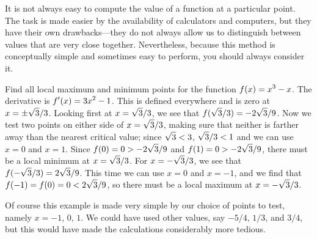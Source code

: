 
It is not always easy to compute the value of a function at a
particular point. The task is made easier by the availability of
calculators and computers, but they have their own drawbacks---they do
not always allow us to distinguish between values that are very close
together. Nevertheless, because this method is conceptually simple and
sometimes easy to perform, you should always consider it.

\begin{example}
Find all local maximum and minimum points for the function 
$\displaystyle f(x)=x^3-x$. The derivative is $\displaystyle f'(x)=3x^2-1$. This is defined
everywhere and is zero at $\displaystyle x=\pm \sqrt{3}/3$. Looking first at
$\displaystyle x=\sqrt{3}/3$, we see that $\displaystyle f(\sqrt{3}/3)=-2\sqrt{3}/9$. Now we test
two points on either side of 
$\displaystyle x=\sqrt{3}/3$, making sure that neither is farther away than
the nearest critical value; since $\displaystyle \sqrt{3}<3$, $\displaystyle \sqrt{3}/3<1$ and
we can use $x=0$ and $x=1$. Since
$\displaystyle f(0)=0>-2\sqrt{3}/9$
and $\displaystyle f(1)=0>-2\sqrt{3}/9$, there must be a local minimum at 
$\displaystyle x=\sqrt{3}/3$. For $\displaystyle x=-\sqrt{3}/3$, we see that
$\displaystyle f(-\sqrt{3}/3)=2\sqrt{3}/9$. This time we can use $x=0$ and $x=-1$,
and we find that $\displaystyle f(-1)=f(0)=0< 2\sqrt{3}/9$, so there must be a local
maximum at $\displaystyle x=-\sqrt{3}/3$.
\end{example}
\label{exam:simple cubic}

Of course this example is made very simple by our choice of points to
test, namely $x=-1$, $0$, $1$. We could have used other values, say
$-5/4$, $1/3$, and $3/4$, but this would have made the calculations
considerably more tedious.


